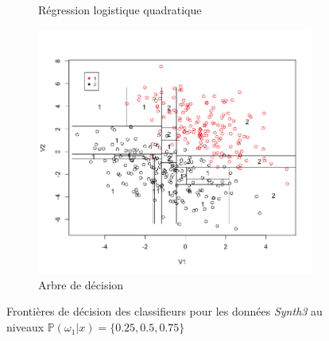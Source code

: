 \documentclass[a4paper,10pt]{report}
\begin{document}
\begin{figure}[H]
\begin{subfigure}[b]{0.45\linewidth}
		\caption{\small Régression logistique quadratique}
		\label{fig:front-decision-synth-3-reg-log-quad}%
	\end{subfigure}%
	\begin{subfigure}[b]{0.45\linewidth}
		\centering
		\captionsetup{justification=centering, margin=1cm}
		\includegraphics[width=1\linewidth]{img/front-decision-synth-3-tree}
		\caption{\small Arbre de décision}
		\label{fig:front-decision-synth-3-tree}%
	\end{subfigure}%
	\caption{\small Frontières de décision des classifieurs pour les données \textit{Synth3} au niveaux $\mathbb{P}(\omega_1|x) = \{0.25, 0.5, 0.75\}$}
	\label{fig:front-decision-synth-3}%
\end{figure}
\end{document}
